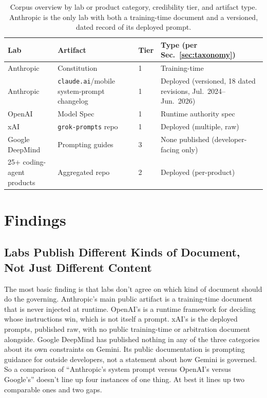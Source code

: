 \documentclass[11pt]{article}
\begin{document}
\begin{table}[htbp]
\centering
\small
\begin{tabular}{@{}p{2.2cm}p{3.7cm}p{1cm}p{6.0cm}@{}}
\toprule
\textbf{Lab} & \textbf{Artifact} & \textbf{Tier} & \textbf{Type (per Sec.~\ref{sec:taxonomy})} \\
\midrule
Anthropic & Constitution & 1 & Training-time \\
Anthropic & \texttt{claude.ai}/mobile system-prompt changelog & 1 & Deployed (versioned, 18 dated revisions, Jul.\ 2024--Jun.\ 2026) \\
OpenAI & Model Spec & 1 & Runtime authority spec \\
xAI & \texttt{grok-prompts} repo & 1 & Deployed (multiple, raw) \\
Google DeepMind & Prompting guides & 3 & None published (developer-facing only) \\
25+ coding-agent products & Aggregated repo & 2 & Deployed (per-product) \\
\bottomrule
\end{tabular}
\caption{Corpus overview by lab or product category, credibility tier, and
artifact type. Anthropic is the only lab with both a training-time document
and a versioned, dated record of its deployed prompt.}
\label{tab:corpus}
\end{table}

\section{Findings}
\label{sec:findings}

\subsection{Labs Publish Different Kinds of Document, Not Just Different Content}
The most basic finding is that labs don't agree on which kind of document
should do the governing. Anthropic's main public artifact is a training-time
document that is never injected at runtime. OpenAI's is a runtime framework
for deciding whose instructions win, which is not itself a prompt. xAI's is
the deployed prompts, published raw, with no public training-time or
arbitration document alongside. Google DeepMind has published nothing in any
of the three categories about its own constraints on Gemini. Its public
documentation is prompting guidance for outside developers, not a statement
about how Gemini is governed. So a comparison of ``Anthropic's system prompt
versus OpenAI's versus Google's'' doesn't line up four instances of one
thing. At best it lines up two comparable ones and two gaps.
\end{document}
